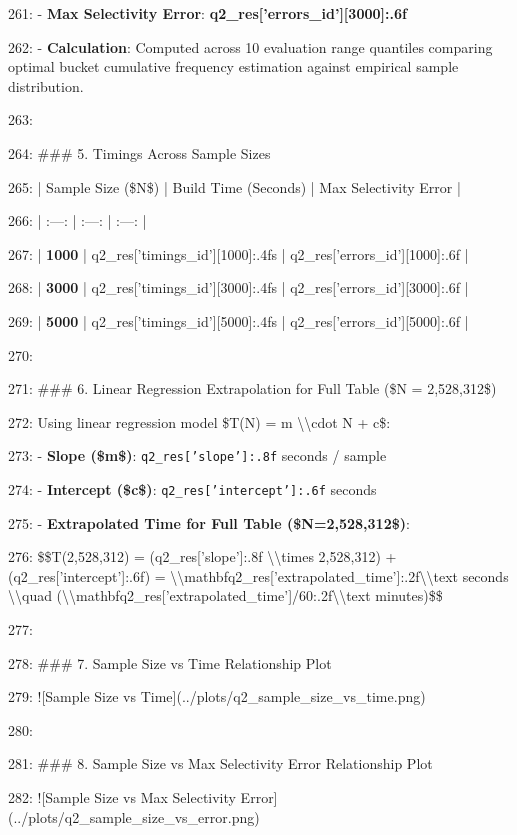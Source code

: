 \documentclass[11pt,a4paper]{article}
\begin{document}
261: - \textbf{Max Selectivity Error}: \textbf{{q2\_res['errors\_id'][3000]:.6f}}

262: - \textbf{Calculation}: Computed across 10 evaluation range quantiles comparing optimal bucket cumulative frequency estimation against empirical sample distribution.

263:

264: \#\#\# 5. Timings Across Sample Sizes

265: | Sample Size (\$N\$) | Build Time (Seconds) | Max Selectivity Error |

266: | :---: | :---: | :---: |

267: | \textbf{1000} | {q2\_res['timings\_id'][1000]:.4f}s | {q2\_res['errors\_id'][1000]:.6f} |

268: | \textbf{3000} | {q2\_res['timings\_id'][3000]:.4f}s | {q2\_res['errors\_id'][3000]:.6f} |

269: | \textbf{5000} | {q2\_res['timings\_id'][5000]:.4f}s | {q2\_res['errors\_id'][5000]:.6f} |

270:

271: \#\#\# 6. Linear Regression Extrapolation for Full Table (\$N = 2,528,312\$)

272: Using linear regression model \$T(N) = m \textbackslash{}\textbackslash{}cdot N + c\$:

273: - \textbf{Slope (\$m\$)}: \texttt{{q2\_res['slope']:.8f}} seconds / sample

274: - \textbf{Intercept (\$c\$)}: \texttt{{q2\_res['intercept']:.6f}} seconds

275: - \textbf{Extrapolated Time for Full Table (\$N=2,528,312\$)}:

276:   \$\$T(2,528,312) = ({q2\_res['slope']:.8f} \textbackslash{}\textbackslash{}times 2,528,312) + ({q2\_res['intercept']:.6f}) = \textbackslash{}\textbackslash{}mathbf{{{q2\_res['extrapolated\_time']:.2f}\textbackslash{}\textbackslash{}text{{ seconds}}}} \textbackslash{}\textbackslash{}quad (\textbackslash{}\textbackslash{}mathbf{{{q2\_res['extrapolated\_time']/60:.2f}\textbackslash{}\textbackslash{}text{{ minutes}}}})\$\$

277:

278: \#\#\# 7. Sample Size vs Time Relationship Plot

279: ![Sample Size vs Time](../plots/q2\_sample\_size\_vs\_time.png)

280:

281: \#\#\# 8. Sample Size vs Max Selectivity Error Relationship Plot

282: ![Sample Size vs Max Selectivity Error](../plots/q2\_sample\_size\_vs\_error.png)
\end{document}
